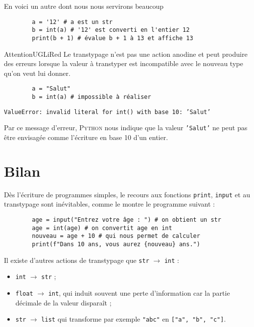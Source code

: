 En voici un autre dont nous nous servirons beaucoup
\begin{pyc}
    \begin{verbatim}
        a = '12' # a est un str
        b = int(a) # '12' est converti en l'entier 12
        print(b + 1) # évalue b + 1 à 13 et affiche 13
    \end{verbatim}
\end{pyc}

\begin{encadrecolore}{Attention}{UGLiRed}
    Le transtypage n'est pas une action anodine et peut produire des erreurs lorsque la valeur à transtyper est incompatible avec le nouveau type qu'on veut lui donner.
\end{encadrecolore}

\begin{pyc}
    \begin{verbatim}
        a = "Salut"
        b = int(a) # impossible à réaliser
    \end{verbatim}
    {\color{UGLiRed}\texttt{ValueError: invalid literal for int() with base 10: 'Salut'}}
\end{pyc}
Par ce message d'erreur, \textsc{Python} nous indique que la valeur \texttt{'Salut'} ne peut pas être envisagée comme l'écriture en base 10 d'un entier.

\section{Bilan}
Dès l'écriture de programmes simples, le recours aux fonctions \texttt{print}, \texttt{input} et au transtypage sont inévitables, comme le montre le programme suivant :

\begin{pyc}
    \begin{verbatim}
        age = input("Entrez votre âge : ") # on obtient un str
        age = int(age) # on convertit age en int
        nouveau = age + 10 # qui nous permet de calculer
        print(f"Dans 10 ans, vous aurez {nouveau} ans.")
    \end{verbatim}
\end{pyc}

Il existe d'autres actions de transtypage que \texttt{str} $\rightarrow$ \texttt{int} :
\begin{itemize}
    \item \texttt{int} $\rightarrow$ \texttt{str} ;
    \item \texttt{float} $\rightarrow$ \texttt{int}, qui induit souvent une perte d'information car la partie décimale de la valeur disparaît ;
    \item \texttt{str} $\rightarrow$ \texttt{list} qui transforme par exemple \texttt{"abc"} en \texttt{["a", "b", "c"]}.  
\end{itemize}
